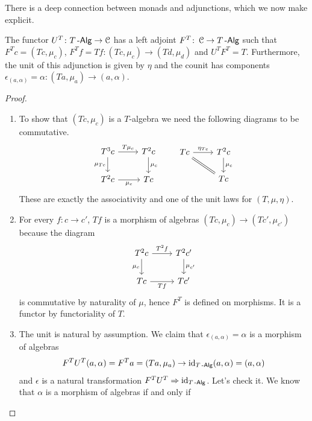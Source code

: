 \documentclass[a4paper,11pt,oneside,openany]{scrbook}
\begin{document}
There is a deep connection between monads and adjunctions, which we now make
explicit.

\begin{prop}
	The functor $U^T\colon T\operatorname{-\mathsf{Alg}}\rightarrow\operatorname{\mathcal{C}}$ has a left adjoint
    $F^T\colon\operatorname{\mathcal{C}}\rightarrow T\operatorname{-\mathsf{Alg}}$ such that $F^Tc=(Tc,\mu_{c})$, $F^Tf=Tf\colon(Tc,\mu_{c})\rightarrow(Td,\mu_{d})$ and $U^TF^T=T$. Furthermore, the unit of this adjunction is given by $\eta$ and the counit has components $\epsilon_{(a,\alpha)}=\alpha\colon(Ta,\mu_a)\to(a,\alpha)$.
\end{prop}
\begin{proof}
	\begin{enumerate}[label=(\roman*)]
		\item To show that $(Tc, \mu_c)$ is a $T$-algebra we need the following diagrams to be commutative.
		      \[
			      \begin{tikzcd}
				      T^3c\ar["\mu_{Tc}"', rightarrow]{d}\ar["T\mu_c", rightarrow]{r}
				      & T^2c\ar["\mu_c", rightarrow]{d} \\
				      T^2c\ar["\mu_c"', rightarrow]{r}
				      & Tc
			      \end{tikzcd}
			      \quad\quad
			      \begin{tikzcd}
				      Tc\ar["\eta_{Tc}",rightarrow]{r}\ar[equal]{dr}
				      & T^2c\ar["\mu_c", rightarrow]{d}
				      \\
				      & Tc
			      \end{tikzcd}
		      \]
		      These are exactly the associativity and one of the unit laws for $(T, \mu, \eta)$.
		\item For every $f\colon c\to c'$, $Tf$ is a morphism of algebras $(Tc,\mu_c)\to(Tc', \mu_{c'})$ because the diagram
		      \[
			      \begin{tikzcd}
				      T^2c\ar["\mu_{c}"', rightarrow]{d}\ar["T^2f", rightarrow]{r}
				      & T^2c'\ar["\mu_{c'}", rightarrow]{d} \\
				      Tc\ar["Tf"', rightarrow]{r}
				      & Tc'
			      \end{tikzcd}
		      \]
		      is commutative by naturality of $\mu$, hence $F^T$ is defined on morphisms. It is a functor by functoriality of $T$.
		\item The unit is natural by assumption. We claim that $\epsilon_{(a,\alpha)}=\alpha$ is a morphism of algebras $$F^TU^T(a,\alpha)=F^Ta=(Ta,\mu_a) \to \operatorname{id}_{T\operatorname{-\mathsf{Alg}}}(a,\alpha)=(a,\alpha)$$ and $\epsilon$ is a natural transformation $F^TU^T\Rightarrow\operatorname{id}_{T\operatorname{-\mathsf{Alg}}}$. Let's check it. We know that $\alpha$ is a morphism of algebras if and only if

\end{enumerate}
\end{proof}
\end{document}
